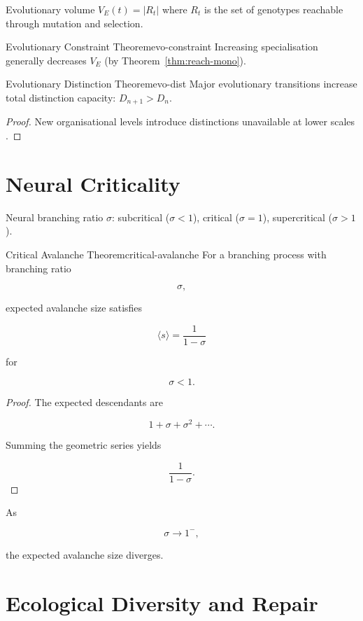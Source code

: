 \documentclass[12pt,twoside,openright]{book}
\begin{document}
Evolutionary volume $V_E(t) = |R_t|$ where $R_t$ is
the set of genotypes reachable through mutation and
selection.

\begin{theorem}{Evolutionary Constraint Theorem}{evo-constraint}
  Increasing specialisation generally decreases $V_E$
  (by Theorem~\ref{thm:reach-mono}).
\end{theorem}

\begin{theorem}{Evolutionary Distinction Theorem}{evo-dist}
  Major evolutionary transitions increase total
  distinction capacity: $D_{n+1} > D_n$.
\end{theorem}

\begin{proof}
  New organisational levels introduce distinctions
  unavailable at lower scales
  \parencite{maynard-smith1995major}.
\end{proof}

\section{Neural Criticality}

Neural branching ratio $\sigma$:
subcritical ($\sigma<1$), critical ($\sigma=1$),
supercritical ($\sigma>1$).

\begin{theorem}{Critical Avalanche Theorem}{critical-avalanche}
For a branching process with branching ratio

\[
\sigma,
\]

expected avalanche size satisfies

\[
\langle s\rangle
=
\frac{1}{1-\sigma}
\]

for

\[
\sigma<1.
\]
\end{theorem}

\begin{proof}
The expected descendants are

\[
1+\sigma+\sigma^2+\cdots.
\]

Summing the geometric series yields

\[
\frac{1}{1-\sigma}.
\]
\end{proof}

As

\[
\sigma\rightarrow1^{-},
\]

the expected avalanche size diverges.

\section{Ecological Diversity and Repair}
\end{document}
